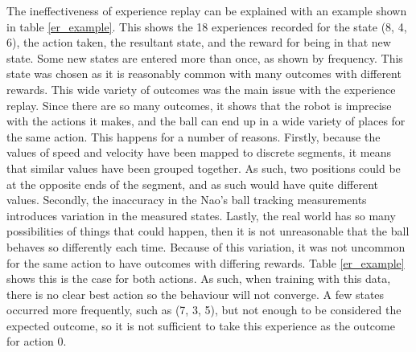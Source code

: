 \documentclass[12pt,a4paper]{article}
\begin{document}
The ineffectiveness of experience replay can be explained with an example shown in table \ref{er_example}. This shows the 18 experiences recorded for the state (8, 4, 6), the action taken, the resultant state, and the reward for being in that new state. Some new states are entered more than once, as shown by frequency. This state was chosen as it is reasonably common with many outcomes with different rewards. This wide variety of outcomes was the main issue with the experience replay. Since there are so many outcomes, it shows that the robot is imprecise with the actions it makes, and the ball can end up in a wide variety of places for the same action. This happens for a number of reasons. Firstly, because the values of speed and velocity have been mapped to discrete segments, it means that similar values have been grouped together. As such, two positions could be at the opposite ends of the segment, and as such would have quite different values. Secondly, the inaccuracy in the Nao's ball tracking measurements introduces variation in the measured states. Lastly, the real world has so many possibilities of things that could happen, then it is not unreasonable that the ball behaves so differently each time. Because of this variation, it was not uncommon for the same action  to have outcomes with differing rewards. Table \ref{er_example} shows this is the case for both actions. As such, when training with this data, there is no clear best action so the behaviour will not converge. A few states occurred more frequently, such as (7, 3, 5), but not enough to be considered the expected outcome, so it is not sufficient to take this experience as the outcome for action 0. 

\end{document}
